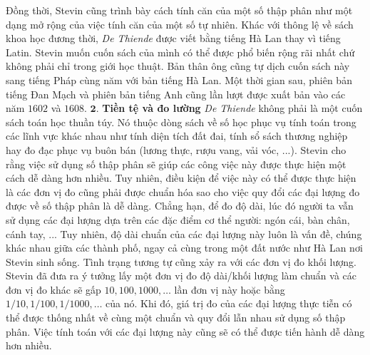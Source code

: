\begin{multicols}{2}
\begin{figure}[H]
	\vspace*{-10pt}
\end{figure}	
	Đồng thời, Stevin cũng trình bày cách tính căn của một số thập phân như một dạng mở rộng của việc tính căn của một số tự nhiên.
	\vskip 0.1cm
	Khác với thông lệ về sách khoa học đương thời, \textit{De Thiende} được viết bằng tiếng Hà Lan thay vì tiếng Latin. Stevin muốn cuốn sách của mình có thể được phổ biến rộng rãi nhất chứ không phải chỉ trong giới học thuật. Bản thân ông cũng tự dịch cuốn sách này sang tiếng Pháp cùng năm với bản tiếng Hà Lan. Một thời gian sau, phiên bản tiếng Đan Mạch và phiên bản tiếng Anh cũng lần lượt được xuất bản vào các năm $1602$ và $1608$.
	\vskip 0.1cm
	$\pmb{2.}$ \textbf{\color{toanhocdoisong}Tiền tệ và đo lường}
	\vskip 0.1cm
	\textit{De Thiende} không phải là một cuốn sách toán học thuần túy. Nó thuộc dòng sách về số học phục vụ tính toán trong các lĩnh vực khác nhau như tính diện tích đất đai, tính sổ sách thương nghiệp hay đo đạc phục vụ buôn bán (lương thực, rượu vang, vải vóc, ...). Stevin cho rằng việc sử dụng số thập phân sẽ giúp các công việc này được thực hiện một cách dễ dàng hơn nhiều. Tuy nhiên, điều kiện để việc này có thể được thực hiện là các đơn vị đo cũng phải được chuẩn hóa sao cho việc quy đổi các đại lượng đo được về số thập phân là dễ dàng. 
	\vskip 0.1cm
	Chẳng hạn, để đo độ dài, lúc đó người ta vẫn sử dụng các đại lượng dựa trên các đặc điểm cơ thể người: ngón cái, bàn chân, cánh \linebreak tay, ... Tuy nhiên, độ dài chuẩn của các đại lượng này luôn là vấn đề, chúng khác nhau giữa các thành phố, ngay cả cùng trong một đất nước như Hà Lan nơi Stevin sinh sống. Tình trạng tương tự cũng xảy ra với các đơn vị đo khối lượng.
	\vskip 0.1cm
	Stevin đã đưa ra ý tưởng lấy một đơn vị đo độ dài/khối lượng làm chuẩn và các đơn vị đo khác sẽ gấp $10, 100, 1000, \ldots$ lần đơn vị này hoặc bằng $1/10, 1/100, 1/1000, \ldots$ của nó. Khi đó, giá trị đo của các đại lượng thực tiễn có thể được thống nhất về cùng một chuẩn và quy đổi lẫn nhau sử dụng số thập phân. Việc tính toán với các đại lượng này cũng sẽ có thể được tiến hành dễ dàng hơn nhiều.
	\vskip 0.1cm

\end{multicols}
